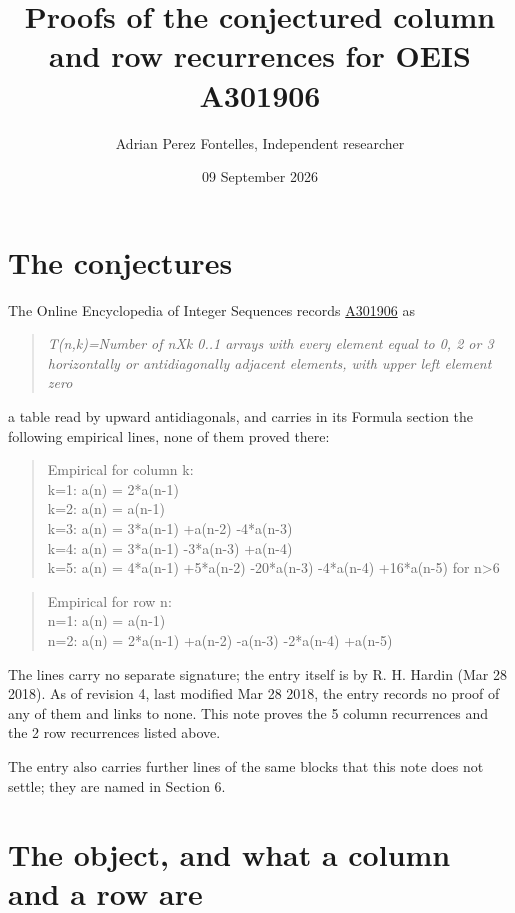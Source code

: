 \documentclass[11pt]{article}
\title{Proofs of the conjectured column and row recurrences for OEIS A301906}
\author{Adrian Perez Fontelles, Independent researcher}
\date{09 September 2026}
\theoremstyle{definition}
\begin{document}
\maketitle
\section{The conjectures}

The Online Encyclopedia of Integer Sequences records \href{https://oeis.org/A301906}{A301906} as

\begin{quote}\itshape T(n,k)=Number of nXk 0..1 arrays with every element equal to 0, 2 or 3 horizontally or antidiagonally adjacent elements, with upper left element zero\end{quote}

a table read by upward antidiagonals, and carries in its Formula section the following empirical lines, none of them proved there:

\begin{quote}\ttfamily Empirical for column k:\\
k=1: a(n) = 2*a(n-1)\\k=2: a(n) = a(n-1)\\k=3: a(n) = 3*a(n-1) +a(n-2) -4*a(n-3)\\k=4: a(n) = 3*a(n-1) -3*a(n-3) +a(n-4)\\k=5: a(n) = 4*a(n-1) +5*a(n-2) -20*a(n-3) -4*a(n-4) +16*a(n-5) for n>6\end{quote}

\begin{quote}\ttfamily Empirical for row n:\\
n=1: a(n) = a(n-1)\\n=2: a(n) = 2*a(n-1) +a(n-2) -a(n-3) -2*a(n-4) +a(n-5)\end{quote}

The lines carry no separate signature; the entry itself is by R. H. Hardin (Mar 28 2018). As of revision 4, last modified Mar 28 2018, the entry records no proof of any of them and links to none. This note proves the 5 column recurrences and the 2 row recurrences listed above.

The entry also carries further lines of the same blocks that this note does not settle; they are named in Section 6.

\section{The object, and what a column and a row are}
\end{document}
